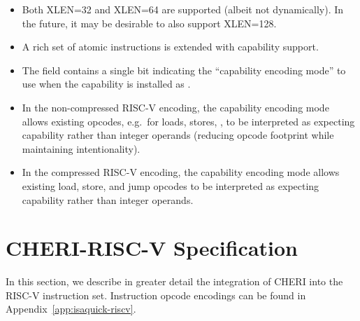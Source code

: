 \begin{itemize}
  When \texttt{satp} is set to \texttt{Bare}, capabilities have a
  physical-address interpretation.
  When \texttt{satp} enables page-table translation, capabilities have a
  virtual-address interpretation.
\item Both XLEN=32 and XLEN=64 are supported (albeit not dynamically).
  In the future, it may be desirable to also support XLEN=128.
\item A rich set of atomic instructions is extended with capability
  support.
\item The \cflags{} field contains a single bit indicating the ``capability
  encoding mode'' to use when the capability is installed as \PCC{}.
\item In the non-compressed RISC-V encoding, the capability encoding mode
  allows existing opcodes, e.g.\ for loads, stores, ,
  to be interpreted as expecting capability rather than integer operands
  (reducing opcode footprint while maintaining intentionality).
\item In the compressed RISC-V encoding, the capability encoding mode allows
  existing load, store, and jump opcodes to be interpreted as expecting
  capability rather than integer operands.

%
\end{itemize}

\section{CHERI-RISC-V Specification}

In this section, we describe in greater detail the integration of CHERI into
the RISC-V instruction set.
Instruction opcode encodings can be found in
Appendix~\ref{app:isaquick-riscv}.


